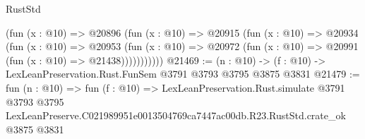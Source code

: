 \begin{lexlean}{RustStd}
\begin{coremodule}
            (fun (x : @10) =>
            @20896
              (fun (x : @10) =>
              @20915
                (fun (x : @10) =>
                @20934
                  (fun (x : @10) =>
                  @20953
                    (fun (x : @10) =>
                    @20972 (fun (x : @10) => @20991 (fun (x : @10) => @21438)))))))))))
@21469 := (n : @10) -> (f : @10) -> LexLeanPreservation.Rust.FunSem @3791 @3793 @3795 @3875 @3831
@21479 := fun (n : @10) =>
  fun (f : @10) =>
  LexLeanPreservation.Rust.simulate
    @3791
    @3793
    @3795
    LexLeanPreserve.C021989951e0013504769ca7447ac00db.R23.RustStd.crate_ok
    @3875
    @3831
\end{coremodule}
\end{lexlean}
